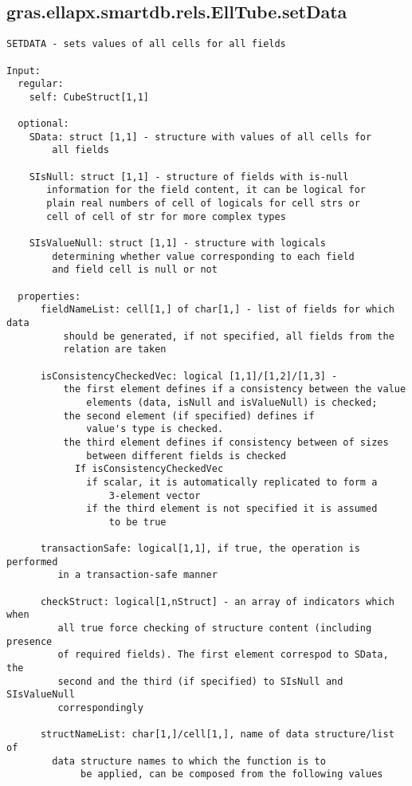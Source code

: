 \subsection{\texorpdfstring{gras.ellapx.smartdb.rels.EllTube.setData}{setData}}\label{method:gras.ellapx.smartdb.rels.EllTube.setData}
\begin{verbatim}
SETDATA - sets values of all cells for all fields

Input:
  regular:
    self: CubeStruct[1,1]

  optional:
    SData: struct [1,1] - structure with values of all cells for
        all fields

    SIsNull: struct [1,1] - structure of fields with is-null
       information for the field content, it can be logical for
       plain real numbers of cell of logicals for cell strs or
       cell of cell of str for more complex types

    SIsValueNull: struct [1,1] - structure with logicals
        determining whether value corresponding to each field
        and field cell is null or not

  properties:
      fieldNameList: cell[1,] of char[1,] - list of fields for which data
          should be generated, if not specified, all fields from the
          relation are taken

      isConsistencyCheckedVec: logical [1,1]/[1,2]/[1,3] -
          the first element defines if a consistency between the value
              elements (data, isNull and isValueNull) is checked;
          the second element (if specified) defines if
              value's type is checked.
          the third element defines if consistency between of sizes
              between different fields is checked
            If isConsistencyCheckedVec
              if scalar, it is automatically replicated to form a
                  3-element vector
              if the third element is not specified it is assumed
                  to be true

      transactionSafe: logical[1,1], if true, the operation is performed
         in a transaction-safe manner

      checkStruct: logical[1,nStruct] - an array of indicators which when
         all true force checking of structure content (including presence
         of required fields). The first element correspod to SData, the
         second and the third (if specified) to SIsNull and SIsValueNull
         correspondingly

      structNameList: char[1,]/cell[1,], name of data structure/list of
        data structure names to which the function is to
             be applied, can be composed from the following values


\end{verbatim}
